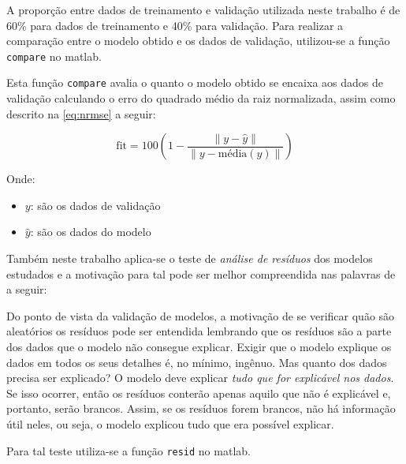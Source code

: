 A proporção entre dados de treinamento e validação utilizada neste trabalho é de 60\% para dados de treinamento
e 40\% para validação. Para realizar a comparação entre o modelo obtido e os dados de validação, utilizou-se
a função \texttt{compare} no \acrshort{matlab}.

Esta função \texttt{compare} avalia o quanto o modelo obtido se encaixa aos dados de validação calculando
o erro do quadrado médio da raiz normalizada, assim como descrito na \cref{eq:nrmse} a seguir:

\begin{equation}
	\label{eq:nrmse}
	\mathrm{fit} = 100 \left( 1 - \frac{ \| y - \hat{y} \| }{ \| y - \mathrm{média}(y) \| } \right)
\end{equation}

\noindent
Onde: 
\begin{itemize}
	\item $y$: são os dados de validação
	\item $\hat{y}$: são os dados do modelo
\end{itemize}

Também neste trabalho aplica-se o teste de \textit{análise de resíduos} dos modelos estudados e a motivação
para tal pode ser melhor compreendida nas palavras de  a seguir:

\begin{citacao}
    \text{[...]} Do ponto de vista da validação de modelos, a motivação de se verificar quão são aleatórios
    os resíduos pode ser entendida lembrando que os resíduos são a parte dos dados que o modelo não
    consegue explicar. Exigir que o modelo explique os dados em todos os seus detalhes é, no mínimo,
    ingênuo. Mas quanto dos dados precisa ser explicado? O modelo deve explicar \textit{tudo que for
    explicável nos dados}. Se isso ocorrer, então os resíduos conterão apenas aquilo que não é explicável e,
    portanto, serão brancos. Assim, se os resíduos forem brancos, não há informação útil neles, ou seja,
    o modelo explicou tudo que era possível explicar. \text{[...]} 
\end{citacao}

Para tal teste utiliza-se a função \texttt{resid} no \acrshort{matlab}.

